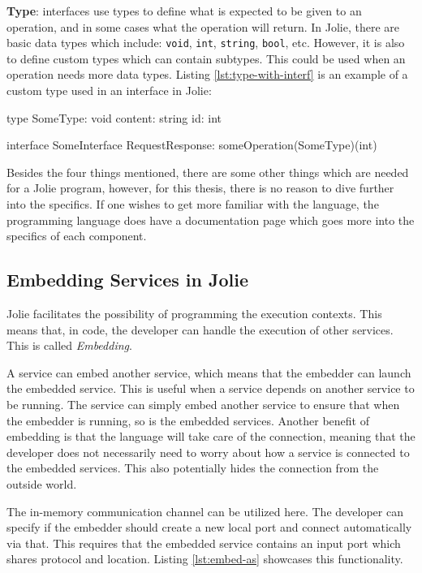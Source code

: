 \textbf{Type}: interfaces use types to define what is expected to be given to an operation, and in some cases what the operation will return. In Jolie, there are basic
data types which include: \texttt{void}, \texttt{int}, \texttt{string}, \texttt{bool}, etc. However, it is also to define custom types which can contain subtypes. 
This could be used when an operation needs more data types.
Listing \ref*{lst:type-with-interf} is an example of a custom type used in an interface in Jolie:
\begin{jolisting}[][caption={Custom type used in an interface in Jolie},label=lst:type-with-interf]
type SomeType: void {
    content: string
    id: int
}

interface SomeInterface {
    RequestResponse:
        someOperation(SomeType)(int)
}
\end{jolisting}

Besides the four things mentioned, there are some other things which are needed for a Jolie program, however, for this thesis, there is no reason to dive further into the specifics.
If one wishes to get more familiar with the language, the programming language does have a documentation page which goes more into the specifics of each component.

\subsection{Embedding Services in Jolie}
Jolie facilitates the possibility of programming the execution contexts.
This means that, in code, the developer can handle the execution of other services. This is called \textit{Embedding}.

A service can embed another service, which means that the embedder can launch the embedded service. This is useful when a service depends on another service to be running.
The service can simply embed another service to ensure that when the embedder is running, so is the embedded services.
Another benefit of embedding is that the language will take care of the connection, meaning that the developer does not necessarily need to worry about how a service is connected to the embedded services.
This also potentially hides the connection from the outside world.

The in-memory communication channel can be utilized here. The developer can specify if the embedder should create a new local port and connect automatically via that. This requires that the embedded service contains an input port which shares protocol and location.
Listing \ref*{lst:embed-as} showcases this functionality.

